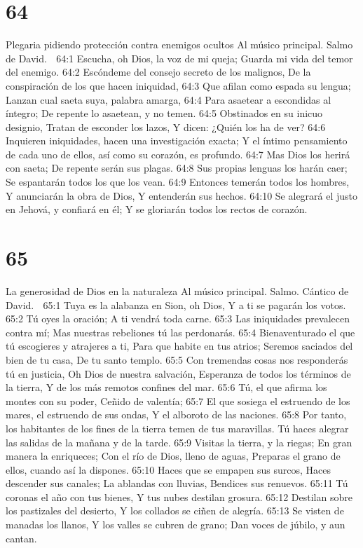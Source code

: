 \chapter{64}

Plegaria pidiendo protección contra enemigos ocultos 
Al músico principal. Salmo de David. 

64:1 Escucha, oh Dios, la voz de mi queja; 
Guarda mi vida del temor del enemigo. 
64:2 Escóndeme del consejo secreto de los malignos, 
De la conspiración de los que hacen iniquidad, 
64:3 Que afilan como espada su lengua; 
Lanzan cual saeta suya, palabra amarga, 
64:4 Para asaetear a escondidas al íntegro; 
De repente lo asaetean, y no temen. 
64:5 Obstinados en su inicuo designio, 
Tratan de esconder los lazos, 
Y dicen: ¿Quién los ha de ver? 
64:6 Inquieren iniquidades, hacen una investigación exacta; 
Y el íntimo pensamiento de cada uno de ellos, así como su corazón, es profundo. 
64:7 Mas Dios los herirá con saeta; 
De repente serán sus plagas. 
64:8 Sus propias lenguas los harán caer; 
Se espantarán todos los que los vean. 
64:9 Entonces temerán todos los hombres, 
Y anunciarán la obra de Dios, 
Y entenderán sus hechos. 
64:10 Se alegrará el justo en Jehová, y confiará en él; 
Y se gloriarán todos los rectos de corazón. 

\chapter{65}

La generosidad de Dios en la naturaleza 
Al músico principal. Salmo. Cántico de David. 

65:1 Tuya es la alabanza en Sion, oh Dios, 
Y a ti se pagarán los votos. 
65:2 Tú oyes la oración; 
A ti vendrá toda carne. 
65:3 Las iniquidades prevalecen contra mí; 
Mas nuestras rebeliones tú las perdonarás. 
65:4 Bienaventurado el que tú escogieres y atrajeres a ti, 
Para que habite en tus atrios; 
Seremos saciados del bien de tu casa, 
De tu santo templo. 
65:5 Con tremendas cosas nos responderás tú en justicia, 
Oh Dios de nuestra salvación, 
Esperanza de todos los términos de la tierra, 
Y de los más remotos confines del mar. 
65:6 Tú, el que afirma los montes con su poder, 
Ceñido de valentía; 
65:7 El que sosiega el estruendo de los mares, el estruendo de sus ondas, 
Y el alboroto de las naciones. 
65:8 Por tanto, los habitantes de los fines de la tierra temen de tus maravillas. 
Tú haces alegrar las salidas de la mañana y de la tarde. 
65:9 Visitas la tierra, y la riegas; 
En gran manera la enriqueces; 
Con el río de Dios, lleno de aguas, 
Preparas el grano de ellos, cuando así la dispones. 
65:10 Haces que se empapen sus surcos, 
Haces descender sus canales; 
La ablandas con lluvias, 
Bendices sus renuevos. 
65:11 Tú coronas el año con tus bienes, 
Y tus nubes destilan grosura. 
65:12 Destilan sobre los pastizales del desierto, 
Y los collados se ciñen de alegría. 
65:13 Se visten de manadas los llanos, 
Y los valles se cubren de grano; 
Dan voces de júbilo, y aun cantan. 

